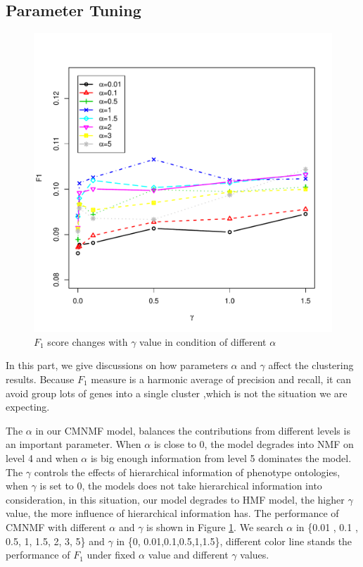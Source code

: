 \documentclass{bmcart}
\begin{document}
\subsection*{\textbf{Parameter Tuning}}
\begin{figure}[!h]
  \begin{minipage}[t]{0.7\linewidth}
    \includegraphics[width=\linewidth,origin = l]{DrawPictures/alpha-gamma.pdf}
  \end{minipage}
  \caption{$F_1$ score changes with $\gamma$ value in condition of different $\alpha$}
  \label{fig:alpha_gamma}
\end{figure}

In this part, we give discussions on how parameters $\alpha$ and $\gamma$ affect the clustering results. Because $F_1$ measure is a  harmonic average of precision and recall, it can avoid group lots of genes into a single cluster ,which is not the situation we are expecting.

The $\alpha$ in our CMNMF model, balances the contributions from different levels is an important parameter. When $\alpha$ is close to 0, the model degrades into NMF on level 4 and when $\alpha$ is big enough information from level 5 dominates the model. The $\gamma$ controls the effects of hierarchical information of phenotype ontologies, when $\gamma$ is set to 0, the models does not take hierarchical information into consideration, in this situation, our model degrades to HMF model, the higher $\gamma$ value, the more influence of hierarchical information has.
 The performance of CMNMF with different $\alpha$ and $\gamma$ is shown in Figure \ref{fig:alpha_gamma}. We search $\alpha$ in \{0.01 , 0.1 , 0.5, 1, 1.5, 2, 3, 5\} and $\gamma$ in \{0, 0.01,0.1,0.5,1,1.5\}, different color line stands the performance of $F_1$ under fixed $\alpha$ value and different $\gamma$ values.
\end{document}
